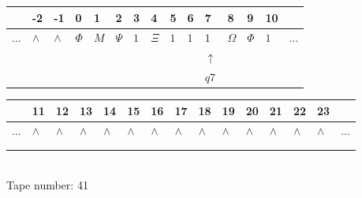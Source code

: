 \documentclass[11pt]{article}
\begin{document}
\begin{table}[H]
\centering
\begin{tabular}{lllllllllllllll}
 & -2 & -1 & 0 & 1 & 2 & 3 & 4 & 5 & 6 & 7 & 8 & 9 & 10 & \\
\hline
$...$ & \multicolumn{1}{|l|}{$\wedge$} & \multicolumn{1}{|l|}{$\wedge$} & \multicolumn{1}{|l|}{$\Phi$} & \multicolumn{1}{|l|}{$M$} & \multicolumn{1}{|l|}{$\Psi$} & \multicolumn{1}{|l|}{$1$} & \multicolumn{1}{|l|}{$\Xi$} & \multicolumn{1}{|l|}{$1$} & \multicolumn{1}{|l|}{$1$} & \multicolumn{1}{|l|}{$1$} & \multicolumn{1}{|l|}{$\Omega$} & \multicolumn{1}{|l|}{$\Phi$} & \multicolumn{1}{|l|}{$1$} & $...$\\
\hline
&  &  &  &  &  &  &  &  &  & $\uparrow$ &  &  &  &  \\
&  &  &  &  &  &  &  &  &  & $ q7 $ &  &  &  &  \\
\end{tabular}
\begin{tabular}{lllllllllllllll}
 & 11 & 12 & 13 & 14 & 15 & 16 & 17 & 18 & 19 & 20 & 21 & 22 & 23 & \\
\hline
$...$ & \multicolumn{1}{|l|}{$\wedge$} & \multicolumn{1}{|l|}{$\wedge$} & \multicolumn{1}{|l|}{$\wedge$} & \multicolumn{1}{|l|}{$\wedge$} & \multicolumn{1}{|l|}{$\wedge$} & \multicolumn{1}{|l|}{$\wedge$} & \multicolumn{1}{|l|}{$\wedge$} & \multicolumn{1}{|l|}{$\wedge$} & \multicolumn{1}{|l|}{$\wedge$} & \multicolumn{1}{|l|}{$\wedge$} & \multicolumn{1}{|l|}{$\wedge$} & \multicolumn{1}{|l|}{$\wedge$} & \multicolumn{1}{|l|}{$\wedge$} & $...$\\
\hline
&  &  &  &  &  &  &  &  &  &  &  &  &  &  \\
&  &  &  &  &  &  &  &  &  &  &  &  &  &  \\
\end{tabular}
\\
Tape number: 41
\noindent\makebox[\linewidth]{\hdashrule{\textwidth}{1pt}{1pt}}\end{table}
\end{document}
